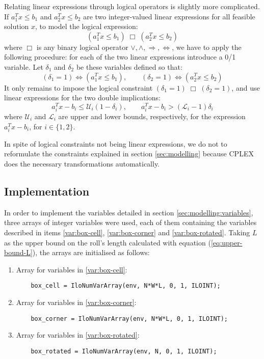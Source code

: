Relating linear expressions through logical operators is slightly more complicated.
If $a_1^Tx \le b_1$ and $a_2^Tx \le b_2$ are two integer-valued linear expressions
for all feasible solution $x$, to model the logical expression:
\[
(a_1^Tx \le b_1) \;\Box\; (a_2^Tx \le b_2)
\]
where $\Box$ is any binary logical operator $\vee,\wedge,\Longrightarrow,\Longleftrightarrow$,
we have to apply the following procedure: for each of the two linear expressions introduce a 0/1
variable. Let $\delta_1$ and $\delta_2$ be these variables defined so that:
\[
(\delta_1 = 1) \Longleftrightarrow (a_1^Tx \le b_1), \qquad 
(\delta_2 = 1) \Longleftrightarrow (a_2^Tx \le b_2)
\]
It only remains to impose the logical constraint $(\delta_1 = 1) \;\Box\; (\delta_2 = 1)$,
and use linear expressions for the two double implications:
\[
a_i^Tx - b_i \le \mathcal{U}_i(1 - \delta_i), \qquad a_i^Tx - b_i > (\mathcal{L}_i - 1)\delta_i
\]
where $\mathcal{U}_i$ and $\mathcal{L}_i$ are upper and lower bounds, respectively, for
the expression $a_i^Tx - b_i$, for $i\in\{1,2\}$.

\hfill

In spite of logical constraints not being linear expressions, we do not to reformulate
the constraints explained in section \ref{sec:modelling} because CPLEX does the necessary
transformations automatically.

\subsection{Implementation}
\label{sec:linear-programming:implementation}

In order to implement the variables detailed in section \ref{sec:modelling:variables},
three arrays of integer variables were used, each of them containing the variables described
in items \ref{var:box-cell}, \ref{var:box-corner} and \ref{var:box-rotated}. Taking
$L$ as the upper bound on the roll's length calculated with equation (\ref{eq:upper-bound-L}),
the arrays are initialised as follows:

\begin{enumerate}
	\item Array for variables in \ref{var:box-cell}:
    
	{\NOINDENT \begin{lstlisting}
	box_cell = IloNumVarArray(env, N*W*L, 0, 1, ILOINT);
	\end{lstlisting}}
    
	\item Array for variables in \ref{var:box-corner}:
    
	{\NOINDENT \begin{lstlisting}
	box_corner = IloNumVarArray(env, N*W*L, 0, 1, ILOINT);
	\end{lstlisting}}
    
	\item Array for variables in \ref{var:box-rotated}:
    
	{\NOINDENT \begin{lstlisting}
	box_rotated = IloNumVarArray(env, N, 0, 1, ILOINT);
	\end{lstlisting}}
    
\end{enumerate}


